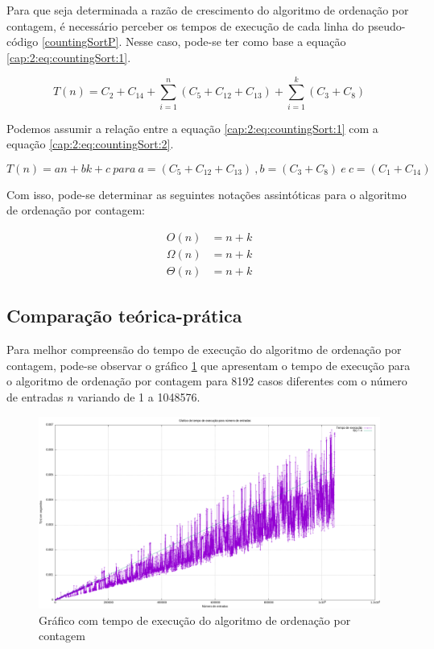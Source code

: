 Para que seja determinada a razão de crescimento do algoritmo de ordenação por contagem, é necessário
perceber os tempos de execução de cada linha do pseudo-código \ref{countingSortP}.
Nesse caso, pode-se ter como base a equação \ref{cap:2:eq:countingSort:1}.

\begin{equation} \label{cap:2:eq:countingSort:1}
    T(n) = C_2 + C_{14} + \sum_{i=1}^{n}(C_5 + C_{12} + C_{13}) + \sum_{i=1}^{k}(C_3 + C_8)
\end{equation}

Podemos assumir a relação entre a equação 
\ref{cap:2:eq:countingSort:1} com a equação \ref{cap:2:eq:countingSort:2}.

\begin{equation} \label{cap:2:eq:countingSort:2}
    T(n) = an + bk + c\  para\  a = (C_5 + C_{12} + C_{13}) \ ,b = (C_3 + C_8) \ e \ c = (C_1 + C_{14})
\end{equation}

Com isso, pode-se determinar as seguintes notações assintóticas para o algoritmo de ordenação por contagem:

\begin{align*} \label{cap:2:eq:countingSort:3}
    O(n) &= n + k \\ 
    \Omega(n) &= n + k \\
    \Theta(n) &= n + k
\end{align*}

\subsection{Comparação teórica-prática}

Para melhor compreensão do tempo de execução do algoritmo de ordenação por contagem, pode-se observar o gráfico 
\ref{cap:2:graph:countingSort} que apresentam o tempo de execução para o algoritmo de ordenação por contagem
para 8192 casos diferentes com o número de entradas $n$ variando de 1 a 1048576.

\begin{figure}[h]
    \centering
    \includegraphics[width=\textwidth]{image/graphics/countingSort.png}
    \caption{Gráfico com tempo de execução do algoritmo de ordenação por contagem}
    \label{cap:2:graph:countingSort}
\end{figure}

